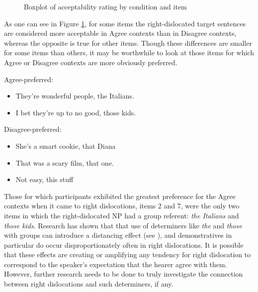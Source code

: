 \documentclass[titlepage,12pt]{article}
\begin{document}

\begin{figure}[bth]
\centering
{}
\caption{Boxplot of acceptability rating by condition and item}
\label{byit}
\end{figure}


As one can see in Figure \ref{byit}, for some items the right-dislocated target sentences are considered more acceptable in Agree contexts than in Disagree contexts, whereas the opposite is true for other items. Though these differences are smaller for some items than others, it may be worthwhile to look at those items for which Agree or Disagree contexts are more obviously preferred.

\begin{multicols}{2}
\samepage
Agree-preferred:
\begin{itemize}
    \item They're wonderful people, the Italians.
    \item I bet they're up to no good, those kids.
\end{itemize}\vfill\null
\columnbreak
Disagree-preferred:
\begin{itemize}
    \item She's a smart cookie, that Diana
    \item That was a scary film, that one.
    \item Not easy, this stuff
\end{itemize}
\end{multicols}

Those for which participants exhibited the greatest preference for the Agree contexts when it came to right dislocations, items 2 and 7, were the only two items in which the right-dislocated NP had a group referent: \textit{the Italians} and \textit{those kids}. Research has shown that that use of determiners like \textit{the} and \textit{those} with groups can introduce a distancing effect (see \citealt{acton2014pragmatics}), and demonstratives in particular do occur disproportionately often in right dislocations. 
It is possible that these effects are creating or amplifying any tendency for right dislocation to correspond to the speaker's expectation that the hearer agree with them. However, further research needs to be done to truly investigate the connection between right dislocations and such determiners, if any.
\end{document}
